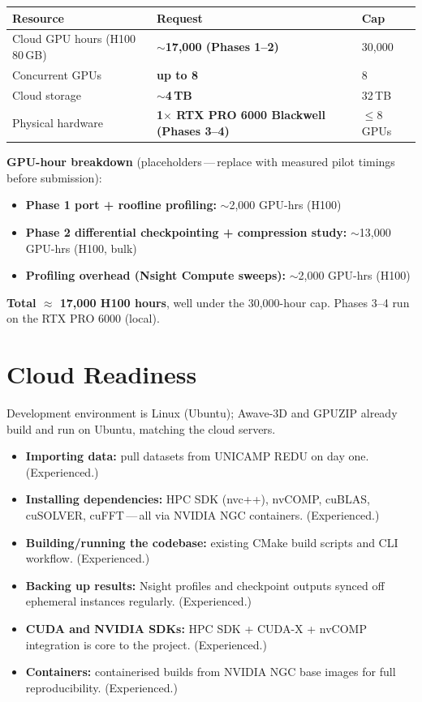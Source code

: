 \documentclass[11pt,a4paper]{article}
\newcommand{\gpuzip}{GPUZIP}
\begin{document}
\begin{center}
\small
\begin{tabularx}{\textwidth}{@{}X l l@{}}
\toprule
\textbf{Resource} & \textbf{Request} & \textbf{Cap} \\
\midrule
Cloud GPU hours (H100 80\,GB) & \textbf{$\sim$17,000 (Phases 1--2)} & 30,000 \\
Concurrent GPUs & \textbf{up to 8} & 8 \\
Cloud storage & \textbf{$\sim$4\,TB} & 32\,TB \\
Physical hardware & \textbf{1$\times$ RTX PRO 6000 Blackwell (Phases 3--4)} &
  $\leq$8 GPUs \\
\bottomrule
\end{tabularx}
\end{center}

\textbf{GPU-hour breakdown} (placeholders\,---\,replace with measured pilot
timings before submission):

\begin{itemize}
  \item \textbf{Phase 1 port + roofline profiling:} $\sim$2,000 GPU-hrs (H100)
  \item \textbf{Phase 2 differential checkpointing + compression study:}
        $\sim$13,000 GPU-hrs (H100, bulk)
  \item \textbf{Profiling overhead (Nsight Compute sweeps):} $\sim$2,000
        GPU-hrs (H100)
\end{itemize}

\textbf{Total $\approx$ 17,000 H100 hours}, well under the 30,000-hour cap.
Phases 3--4 run on the RTX PRO 6000 (local).

\section*{Cloud Readiness}

Development environment is Linux (Ubuntu); Awave-3D and \gpuzip{} already build
and run on Ubuntu, matching the cloud servers.

\begin{itemize}
  \item \textbf{Importing data:} pull datasets from UNICAMP REDU on day one.
        (Experienced.)
  \item \textbf{Installing dependencies:} HPC SDK (nvc++), nvCOMP, cuBLAS,
        cuSOLVER, cuFFT\,---\,all via NVIDIA NGC containers. (Experienced.)
  \item \textbf{Building/running the codebase:} existing CMake build scripts and
        CLI workflow. (Experienced.)
  \item \textbf{Backing up results:} Nsight profiles and checkpoint outputs
        synced off ephemeral instances regularly. (Experienced.)
  \item \textbf{CUDA and NVIDIA SDKs:} HPC SDK + CUDA-X + nvCOMP integration is
        core to the project. (Experienced.)
  \item \textbf{Containers:} containerised builds from NVIDIA NGC base images
        for full reproducibility. (Experienced.)
\end{itemize}
\end{document}
